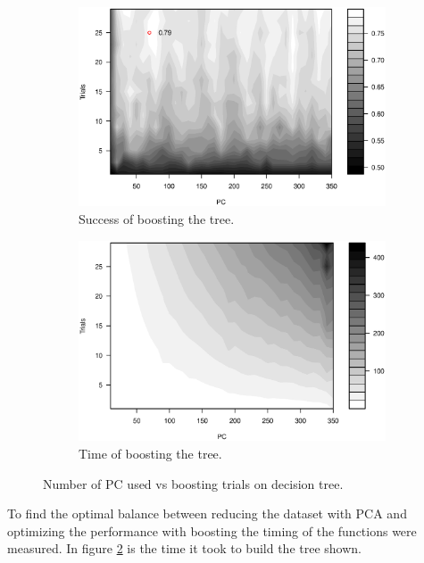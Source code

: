 \begin{figure}[H]
\centering
    \begin{subfigure}{0.49\textwidth}
        \includegraphics[width=\textwidth]{graphics/tree_pca_vs_boost_success}
        \caption{Success of boosting the tree.}
        \label{fig:tree_pca_boost}
    \end{subfigure}
    \begin{subfigure}{0.49\textwidth}
        \includegraphics[width=\textwidth]{graphics/tree_pca_vs_boost_time}
        \caption{Time of boosting the tree.}
        \label{fig:tree_pca_boost_timing}
    \end{subfigure}
\caption{Number of PC used vs boosting trials on decision tree.}
\label{fig:tree_pca_boost}
\end{figure}

To find the optimal balance between reducing the dataset with PCA and optimizing the performance with boosting the timing of the functions were measured.
In figure \ref{fig:tree_pca_boost_timing} is the time it took to build the tree shown.

